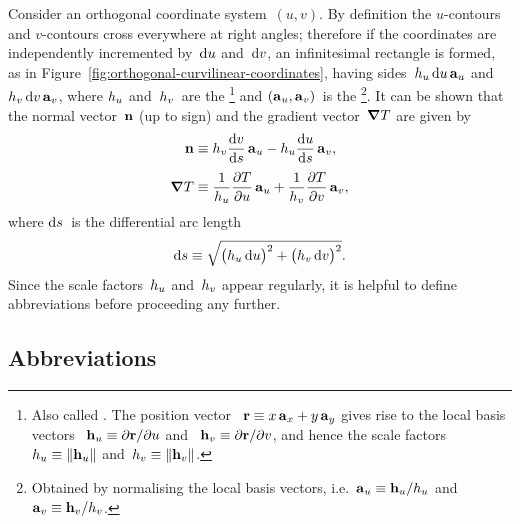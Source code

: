 Consider an orthogonal coordinate system~$(u, v)$.
By definition the $u$-contours and $v$-contours
cross everywhere at right angles;
therefore if the coordinates are independently incremented
by~$\mathop{}\!\mathrm{d} u$ and~$\mathop{}\!\mathrm{d} v$,
an infinitesimal rectangle is formed,
as in Figure~\ref{fig:orthogonal-curvilinear-coordinates},
having sides~$\scalefac[u] \td u \basisvec{u}$
and~$\scalefac[v] \td v \basisvec{v}$,
where $\scalefac[u]$ and~$\scalefac[v]$~are the %
\footnote{
  Also called .
  The position vector~%
    $\boldsymbol{\mathbf{r}} \equiv x \mathop{}\!\boldsymbol{\mathbf{a}}_{x} + y \mathop{}\!\boldsymbol{\mathbf{a}}_{y}$
  gives rise to the local basis vectors~%
    $\mathop{}\!\boldsymbol{\mathbf{h}}_{u} \equiv \mathop{}\!\partial\boldsymbol{\mathbf{r}} / {\mathop{}\!\partial u}$
  and~%
    $\mathop{}\!\boldsymbol{\mathbf{h}}_{v} \equiv \mathop{}\!\partial\boldsymbol{\mathbf{r}} / {\mathop{}\!\partial v}$,
  and hence the scale factors~$\scalefac[u] \ideq \norm{\localvec{u}}$
  and~$\scalefac[v] \ideq \norm{\localvec{v}}$.
}
and $(\mathop{}\!\boldsymbol{\mathbf{a}}_{u}, \mathop{}\!\boldsymbol{\mathbf{a}}_{v})$~is the %
\footnote{
  Obtained by normalising the local basis vectors,
  i.e.~$\basisvec{u} \ideq \localvec{u} / \scalefac[u]$
  and~$\basisvec{v} \ideq \localvec{v} / \scalefac[v]$.
}.
It can be shown that the normal vector~$\mathop{}\!\boldsymbol{\mathbf{n}}$ (up to sign)
and the gradient vector~$\mathop{}\!\boldsymbol{\mathbf{\nabla}} T$ are given by
\begin{align}
  \normalvec &\ideq
    \scalefac[v] \tder{v}{s} \basisvec{u}
      -
    \scalefac[u] \tder{u}{s} \basisvec{v},
    \label{eq:normal-vector}
    \\[\tallspace]
  \del T &\ideq
    \frac{1}{\scalefac[u]} \pder{T}{u} \basisvec{u}
      +
    \frac{1}{\scalefac[v]} \pder{T}{v} \basisvec{v},
    \label{eq:gradient}
\end{align}
where $\mathop{}\!\mathrm{d} s$~is the differential arc length
\begin{equation}
  \td s \ideq
  \sqrt{
    \roundbr[\big]{\scalefac[u] \td u}^2
      +
    \roundbr[\big]{\scalefac[v] \td v}^2
  }.
  \label{eq:differential-arc-length}
\end{equation}
Since the scale factors~$\scalefac[u]$ and~$\scalefac[v]$ appear regularly,
it is helpful to define abbreviations
before proceeding any further.

\subsection{Abbreviations}
\label{sec:curvilinear.derivative.abbreviations}

